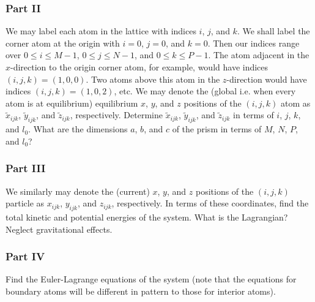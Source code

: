 \documentclass[letterpaper,12pt]{article}
\begin{document}
\begin{flushleft}
    \subsubsection*{Part II}
    We may label each atom in the lattice with indices $i$, $j$, and $k$. We shall label the corner atom at the origin with $i = 0$, $j = 0$, and $k = 0$. Then our indices range over $0 \leq i \leq M-1$, $0 \leq j \leq N-1$, and $0 \leq k \leq P-1$. The atom adjacent in the $x$-direction to the origin corner atom, for example, would have indices $(i, j, k) = (1, 0, 0)$. Two atoms above this atom in the $z$-direction would have indices $(i, j, k) = (1, 0, 2)$, etc. We may denote the (global i.e. when every atom is at equilibrium) equilibrium $x$, $y$, and $z$ positions of the $(i, j, k)$ atom as $\tilde{x}_{ijk}$, $\tilde{y}_{ijk}$, and $\tilde{z}_{ijk}$, respectively. \newline\newline
    Determine $\tilde{x}_{ijk}$, $\tilde{y}_{ijk}$, and $\tilde{z}_{ijk}$ in terms of $i$, $j$, $k$, and $l_0$. What are the dimensions $a$, $b$, and $c$ of the prism in terms of $M$, $N$, $P$, and $l_0$?

    \subsubsection*{Part III}
    We similarly may denote the (current) $x$, $y$, and $z$ positions of the $(i, j, k)$ particle as $x_{ijk}$, $y_{ijk}$, and $z_{ijk}$, respectively. In terms of these coordinates, find the total kinetic and potential energies of the system. What is the Lagrangian? Neglect gravitational effects.

    \subsubsection*{Part IV}
    Find the Euler-Lagrange equations of the system (note that the equations for boundary atoms will be different in pattern to those for interior atoms).


\end{flushleft}
\end{document}
